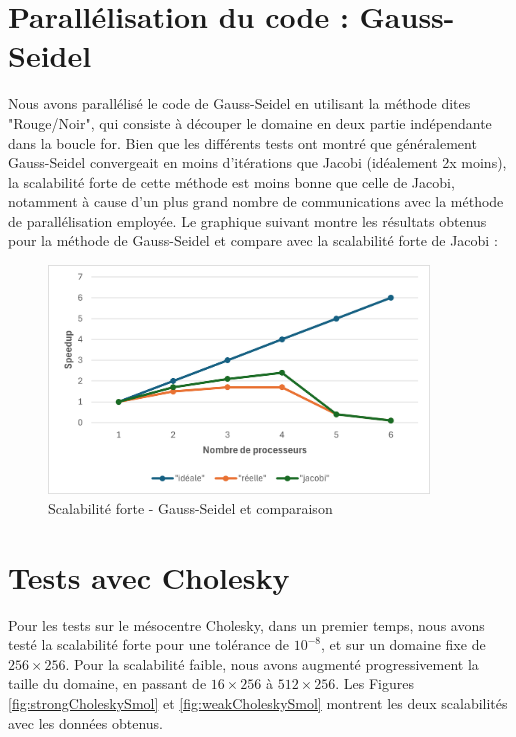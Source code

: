 \documentclass{article}
\begin{document}
\section{Parallélisation du code : Gauss-Seidel}


Nous avons parallélisé le code de Gauss-Seidel en utilisant la méthode dites "Rouge/Noir", qui consiste à découper le domaine en deux partie indépendante dans la boucle for. Bien que les différents tests ont montré que généralement Gauss-Seidel convergeait en moins d'itérations que Jacobi (idéalement 2x moins), la scalabilité forte de cette méthode est moins bonne que celle de Jacobi, notamment à cause d'un plus grand nombre de communications avec la méthode de parallélisation employée. Le graphique suivant montre les résultats obtenus pour la méthode de Gauss-Seidel et compare avec la scalabilité forte de Jacobi :

\begin{figure}[H]
    \centering
    \includegraphics[width=0.9\textwidth]{strong_scaling_gs.png}
    \caption{Scalabilité forte - Gauss-Seidel et comparaison}
    \label{fig:strongGS}
\end{figure}


\section{Tests avec Cholesky}


Pour les tests sur le mésocentre Cholesky, dans un premier temps, nous avons testé la scalabilité forte pour une tolérance de $10^{-8}$, et sur un domaine fixe de $256\times 256$. Pour la scalabilité faible, nous avons augmenté progressivement la taille du domaine, en passant de $16\times 256$ à $512\times 256$. Les Figures \ref{fig:strongCholeskySmol} et \ref{fig:weakCholeskySmol} montrent les deux scalabilités avec les données obtenus.
\end{document}
